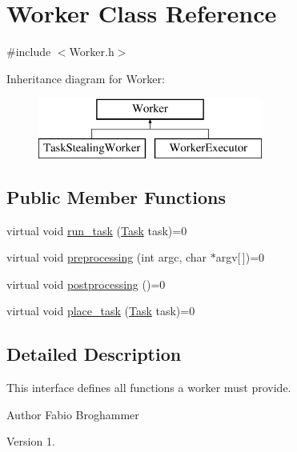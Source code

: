 \hypertarget{class_worker}{}\section{Worker Class Reference}
\label{class_worker}


{\ttfamily \#include $<$Worker.\+h$>$}

Inheritance diagram for Worker\+:\begin{figure}[H]
\begin{center}
\leavevmode
\includegraphics[height=2.000000cm]{class_worker}
\end{center}
\end{figure}
\subsection*{Public Member Functions}
\begin{DoxyCompactItemize}
\item 
virtual void \hyperlink{class_worker_a78d4ec19f0ec658782263b3f64001f39}{run\+\_\+task} (\hyperlink{_types_8h_a0c77930ab3818a1680c59353f627fba8}{Task} task)=0
\item 
virtual void \hyperlink{class_worker_a1562eed9614990073ce47bdfe2cd29e8}{preprocessing} (int argc, char $\ast$argv\mbox{[}$\,$\mbox{]})=0
\item 
virtual void \hyperlink{class_worker_ad3506771c8cd7bb893e195a661cb149d}{postprocessing} ()=0
\item 
virtual void \hyperlink{class_worker_ae60b8eaeb4f246bfca6d2ce65618c7c0}{place\+\_\+task} (\hyperlink{_types_8h_a0c77930ab3818a1680c59353f627fba8}{Task} task)=0
\end{DoxyCompactItemize}


\subsection{Detailed Description}
This interface defines all functions a worker must provide.

\begin{DoxyAuthor}{Author}
Fabio Broghammer 
\end{DoxyAuthor}
\begin{DoxyVersion}{Version}
1. 
\end{DoxyVersion}


